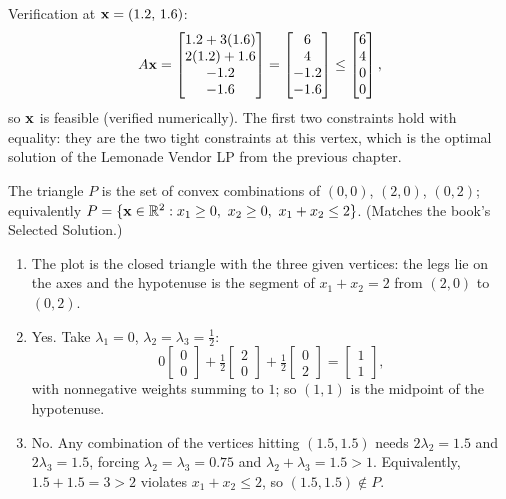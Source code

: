 Verification at $\mathbf{x} = (1.2,\, 1.6)$:
\[
A\mathbf{x} = \begin{bmatrix} 1.2 + 3(1.6) \\ 2(1.2) + 1.6 \\ -1.2 \\ -1.6 \end{bmatrix}
= \begin{bmatrix} 6 \\ 4 \\ -1.2 \\ -1.6 \end{bmatrix} \leq \begin{bmatrix} 6 \\ 4 \\ 0 \\ 0 \end{bmatrix},
\]
so $\mathbf{x}$ is feasible (verified numerically). The first two constraints hold with equality: they are the two tight constraints at this vertex, which is the optimal solution of the Lemonade Vendor LP from the previous chapter.

The triangle $P$ is the set of convex combinations of $(0,0)$, $(2,0)$, $(0,2)$; equivalently $P = \{ \mathbf{x} \in \mathbb{R}^2 : x_1 \geq 0,\ x_2 \geq 0,\ x_1 + x_2 \leq 2 \}$. (Matches the book's Selected Solution.)
\begin{enumerate}
\item The plot is the closed triangle with the three given vertices: the legs lie on the axes and the hypotenuse is the segment of $x_1 + x_2 = 2$ from $(2,0)$ to $(0,2)$.
\item Yes. Take $\lambda_1 = 0$, $\lambda_2 = \lambda_3 = \tfrac12$:
\[
0 \begin{bmatrix} 0 \\ 0 \end{bmatrix} + \tfrac12 \begin{bmatrix} 2 \\ 0 \end{bmatrix} + \tfrac12 \begin{bmatrix} 0 \\ 2 \end{bmatrix} = \begin{bmatrix} 1 \\ 1 \end{bmatrix},
\]
with nonnegative weights summing to $1$; so $(1,1)$ is the midpoint of the hypotenuse.
\item No. Any combination of the vertices hitting $(1.5, 1.5)$ needs $2\lambda_2 = 1.5$ and $2\lambda_3 = 1.5$, forcing $\lambda_2 = \lambda_3 = 0.75$ and $\lambda_2 + \lambda_3 = 1.5 > 1$. Equivalently, $1.5 + 1.5 = 3 > 2$ violates $x_1 + x_2 \leq 2$, so $(1.5, 1.5) \notin P$.
\end{enumerate}

